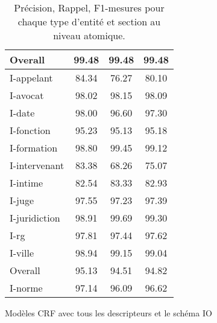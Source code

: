 \begin{table}[!h]
\begin{subfigure}[t]{0.45\textwidth}
\begin{tabular}{|l|ccc|}
Overall &   99.48 &  99.48 &  99.48 \\\hline
 \noalign{\smallskip}\hline\noalign{\smallskip}
I-appelant &   84.34 &  76.27 &  80.10 \\
I-avocat &   98.02 &  98.15 &  98.09 \\
I-date  &   98.00 &  96.60 &  97.30 \\
I-fonction &   95.23 &  95.13 &  95.18 \\
I-formation &   98.80 &  99.45 &  99.12 \\
I-intervenant &   83.38 &  68.26 &  75.07 \\
I-intime &   82.54 &  83.33 &  82.93 \\
I-juge  &   97.55 &  97.23 &  97.39 \\
I-juridiction &   98.91 &  99.69 &  99.30 \\
I-rg    &   97.81 &  97.44 &  97.62 \\
I-ville &   98.94 &  99.15 &  99.04 \\\hline
Overall &   95.13 &  94.51 &  94.82 \\\hline
 \noalign{\smallskip}\hline\noalign{\smallskip}
I-norme &   97.14 &  96.09 &  96.62 \\\hline
\end{tabular}
\caption{Modèles CRF avec tous les descripteurs et le schéma IO}\label{tab:structuration:perf-detail-token-crf}
\end{subfigure} 
\caption{Précision, Rappel, F1-mesures pour chaque type d'entité et section au niveau atomique.}\label{tab:structuration:perf-detail-token}
\end{table}

